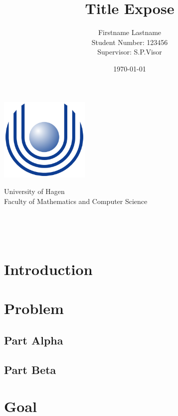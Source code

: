 \documentclass[a4paper,oneside,11pt]{article}
\title{Title Expose}
\author{
    Firstname Lastname\\
    {\small Student Number: 123456}\\
    [1cm]{\small Supervisor: S.P.Visor}
}
\date{\today}
\begin{document}
\begin{titlingpage} %
\begin{center}
\includegraphics[height=4cm]{images/Uni_hagen_logo}\\ %
\begin{large}
University of Hagen \\ %
Faculty of Mathematics and Computer Science\\
\end{large}
\vspace{4cm} %
\begin{large} 
\textbf{\thetitle} \\
\end{large}
\theauthor\\
\vspace{7cm} %
\thedate
\end{center}
\end{titlingpage}

\section{Introduction}


\section{Problem}

\subsection{Part Alpha}

\subsection{Part Beta}


\section{Goal}
\end{document}
